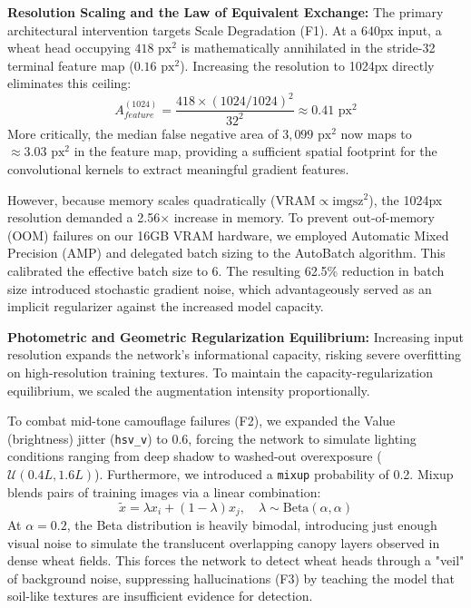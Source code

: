 \textbf{Resolution Scaling and the Law of Equivalent Exchange:} 
The primary architectural intervention targets Scale Degradation (F1). At a 640px input, a wheat head occupying $418\text{ px}^2$ is mathematically annihilated in the stride-32 terminal feature map ($0.16\text{ px}^2$). Increasing the resolution to 1024px directly eliminates this ceiling:
\begin{equation}
A_{feature}^{(1024)} = \frac{418 \times (1024/1024)^2}{32^2} \approx 0.41\text{ px}^2
\end{equation}
More critically, the median false negative area of $3{,}099\text{ px}^2$ now maps to $\approx 3.03\text{ px}^2$ in the feature map, providing a sufficient spatial footprint for the convolutional kernels to extract meaningful gradient features. 

However, because memory scales quadratically ($\text{VRAM} \propto \text{imgsz}^2$), the 1024px resolution demanded a 2.56$\times$ increase in memory. To prevent out-of-memory (OOM) failures on our 16GB VRAM hardware, we employed Automatic Mixed Precision (AMP) and delegated batch sizing to the AutoBatch algorithm. This calibrated the effective batch size to 6. The resulting 62.5\% reduction in batch size introduced stochastic gradient noise, which advantageously served as an implicit regularizer against the increased model capacity.

\textbf{Photometric and Geometric Regularization Equilibrium:} 
Increasing input resolution expands the network's informational capacity, risking severe overfitting on high-resolution training textures. To maintain the capacity-regularization equilibrium, we scaled the augmentation intensity proportionally. 

To combat mid-tone camouflage failures (F2), we expanded the Value (brightness) jitter (\texttt{hsv\_v}) to 0.6, forcing the network to simulate lighting conditions ranging from deep shadow to washed-out overexposure ($\mathcal{U}(0.4L, 1.6L)$). Furthermore, we introduced a \texttt{mixup} probability of 0.2. Mixup blends pairs of training images via a linear combination:
\begin{equation}
\tilde{x} = \lambda x_i + (1 - \lambda) x_j, \quad \lambda \sim \text{Beta}(\alpha, \alpha)
\end{equation}
At $\alpha = 0.2$, the Beta distribution is heavily bimodal, introducing just enough visual noise to simulate the translucent overlapping canopy layers observed in dense wheat fields. This forces the network to detect wheat heads through a "veil" of background noise, suppressing hallucinations (F3) by teaching the model that soil-like textures are insufficient evidence for detection.

